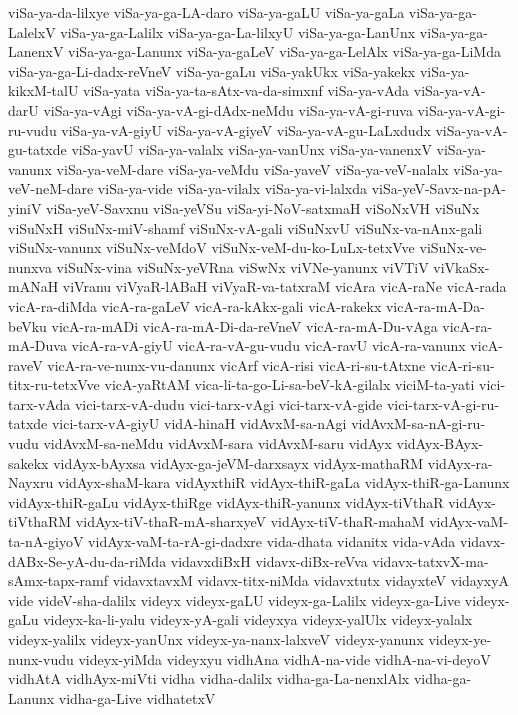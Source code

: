 {viSa-ya-da-lilxye
viSa-ya-ga-LA-daro
viSa-ya-gaLU
viSa-ya-gaLa
viSa-ya-ga-LalelxV
viSa-ya-ga-Lalilx
viSa-ya-ga-La-lilxyU
viSa-ya-ga-LanUnx
viSa-ya-ga-LanenxV
viSa-ya-ga-Lanunx
viSa-ya-gaLeV
viSa-ya-ga-LelAlx
viSa-ya-ga-LiMda
viSa-ya-ga-Li-dadx-reVneV
viSa-ya-gaLu
viSa-yakUkx
viSa-yakekx
viSa-ya-kikxM-talU
viSa-yata
viSa-ya-ta-sAtx-va-da-simxnf
viSa-ya-vAda
viSa-ya-vA-darU
viSa-ya-vAgi
viSa-ya-vA-gi-dAdx-neMdu
viSa-ya-vA-gi-ruva
viSa-ya-vA-gi-ru-vudu
viSa-ya-vA-giyU
viSa-ya-vA-giyeV
viSa-ya-vA-gu-LaLxdudx
viSa-ya-vA-gu-tatxde
viSa-yavU
viSa-ya-valalx
viSa-ya-vanUnx
viSa-ya-vanenxV
viSa-ya-vanunx
viSa-ya-veM-dare
viSa-ya-veMdu
viSa-yaveV
viSa-ya-veV-nalalx
viSa-ya-veV-neM-dare
viSa-ya-vide
viSa-ya-vilalx
viSa-ya-vi-lalxda
viSa-yeV-Savx-na-pA-yiniV
viSa-yeV-Savxnu
viSa-yeVSu
viSa-yi-NoV-satxmaH
viSoNxVH
viSuNx
viSuNxH
viSuNx-miV-shamf
viSuNx-vA-gali
viSuNxvU
viSuNx-va-nAnx-gali
viSuNx-vanunx
viSuNx-veMdoV
viSuNx-veM-du-ko-LuLx-tetxVve
viSuNx-ve-nunxva
viSuNx-vina
viSuNx-yeVRna
viSwNx
viVNe-yanunx
viVTiV
viVkaSx-mANaH
viVranu
viVyaR-lABaH
viVyaR-va-tatxraM
vicAra
vicA-raNe
vicA-rada
vicA-ra-diMda
vicA-ra-gaLeV
vicA-ra-kAkx-gali
vicA-rakekx
vicA-ra-mA-Da-beVku
vicA-ra-mADi
vicA-ra-mA-Di-da-reVneV
vicA-ra-mA-Du-vAga
vicA-ra-mA-Duva
vicA-ra-vA-giyU
vicA-ra-vA-gu-vudu
vicA-ravU
vicA-ra-vanunx
vicA-raveV
vicA-ra-ve-nunx-vu-danunx
vicArf
vicA-risi
vicA-ri-su-tAtxne
vicA-ri-su-titx-ru-tetxVve
vicA-yaRtAM
vica-li-ta-go-Li-sa-beV-kA-gilalx
viciM-ta-yati
vici-tarx-vAda
vici-tarx-vA-dudu
vici-tarx-vAgi
vici-tarx-vA-gide
vici-tarx-vA-gi-ru-tatxde
vici-tarx-vA-giyU
vidA-hinaH
vidAvxM-sa-nAgi
vidAvxM-sa-nA-gi-ru-vudu
vidAvxM-sa-neMdu
vidAvxM-sara
vidAvxM-saru
vidAyx
vidAyx-BAyx-sakekx
vidAyx-bAyxsa
vidAyx-ga-jeVM-darxsayx
vidAyx-mathaRM
vidAyx-ra-Nayxru
vidAyx-shaM-kara
vidAyxthiR
vidAyx-thiR-gaLa
vidAyx-thiR-ga-Lanunx
vidAyx-thiR-gaLu
vidAyx-thiRge
vidAyx-thiR-yanunx
vidAyx-tiVthaR
vidAyx-tiVthaRM
vidAyx-tiV-thaR-mA-sharxyeV
vidAyx-tiV-thaR-mahaM
vidAyx-vaM-ta-nA-giyoV
vidAyx-vaM-ta-rA-gi-dadxre
vida-dhata
vidanitx
vida-vAda
vidavx-dABx-Se-yA-du-da-riMda
vidavxdiBxH
vidavx-diBx-reVva
vidavx-tatxvX-ma-sAmx-tapx-ramf
vidavxtavxM
vidavx-titx-niMda
vidavxtutx
vidayxteV
vidayxyA
vide
videV-sha-dalilx
videyx
videyx-gaLU
videyx-ga-Lalilx
videyx-ga-Live
videyx-gaLu
videyx-ka-li-yalu
videyx-yA-gali
videyxya
videyx-yalUlx
videyx-yalalx
videyx-yalilx
videyx-yanUnx
videyx-ya-nanx-lalxveV
videyx-yanunx
videyx-ye-nunx-vudu
videyx-yiMda
videyxyu
vidhAna
vidhA-na-vide
vidhA-na-vi-deyoV
vidhAtA
vidhAyx-miVti
vidha
vidha-dalilx
vidha-ga-La-nenxlAlx
vidha-ga-Lanunx
vidha-ga-Live
vidhatetxV
}
